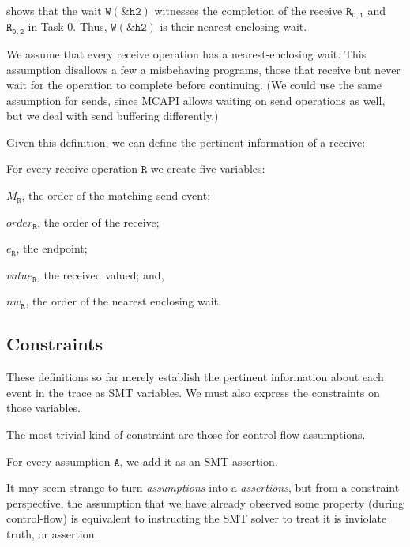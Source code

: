  shows that the wait $\mathtt{W{(\&h2)}}$
witnesses the completion of the receive $\mathtt{R_{0,1}}$ and
$\mathtt{R_{0,2}}$ in Task 0. Thus, $\mathtt{W{(\&h2)}}$ is their
nearest-enclosing wait.

We assume that every receive operation has a nearest-enclosing
wait. This assumption disallows a few a misbehaving programs, those
that receive but never wait for the operation to complete before
continuing.  (We could use the same assumption for sends, since MCAPI
allows waiting on send operations as well, but we deal with send
buffering differently.)

Given this definition, we can define the pertinent information of a
receive:

\begin{definition}[Receive] \label{def:rcv}
For every receive operation $\mathtt{R}$ we create five variables:
\begin{compactenum}
\item $M_\mathtt{R}$, the order of the matching send event;

\item $\mathit{order}_\mathtt{R}$, the order of the receive;

\item $e_\mathtt{R}$, the endpoint;

\item $\mathit{value}_\mathtt{R}$, the received valued; and,

\item $\mathit{nw}_\mathtt{R}$, the order of the nearest enclosing wait.
\end{compactenum}
\end{definition}

\subsection{Constraints}

These definitions so far merely establish the pertinent information
about each event in the trace as SMT variables. We must also express
the constraints on those variables.

The most trivial kind of constraint are those for control-flow
assumptions.

\begin{definition}[Assumption] \label{def:assm}
For every assumption $\mathtt{A}$, we add it as an SMT assertion.
\end{definition}

It may seem strange to turn \emph{assumptions} into a
\emph{assertions}, but from a constraint perspective, the assumption
that we have already observed some property (during control-flow) is
equivalent to instructing the SMT solver to treat it is inviolate
truth, or assertion.

